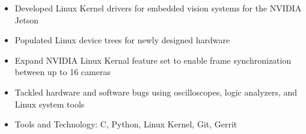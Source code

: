 \begin{itemize}
    \setlength\itemsep{0pt}
    \setlength{\parskip}{0pt}
    \item Developed Linux Kernel drivers for embedded vision systems for the NVIDIA Jetson
    \item Populated Linux device trees for newly designed hardware
    \item Expand NVIDIA Linux Kernal feature set to enable frame synchronization between up to 16 cameras
    \item Tackled hardware and software bugs using oscilloscopes, logic analyzers, and Linux system tools
    \item Tools and Technology: C, Python, Linux Kernel, Git, Gerrit
\end{itemize}
